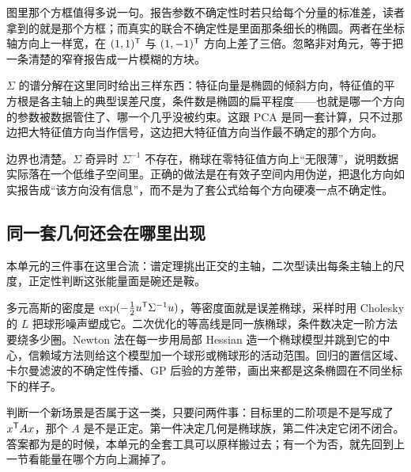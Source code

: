 图里那个方框值得多说一句。报告参数不确定性时若只给每个分量的标准差，读者拿到的就是那个方框；而真实的联合不确定性是里面那条细长的椭圆。两者在坐标轴方向上一样宽，在 \((1,1)^{\mathsf{T}}\) 与 \((1,-1)^{\mathsf{T}}\) 方向上差了三倍。忽略非对角元，等于把一条清楚的窄脊报告成一片模糊的方块。

\(\Sigma\) 的谱分解在这里同时给出三样东西：特征向量是椭圆的倾斜方向，特征值的平方根是各主轴上的典型误差尺度，条件数是椭圆的扁平程度——也就是哪一个方向的参数被数据管住了、哪一个几乎没被约束。这跟 PCA 是同一套计算，只不过那边把大特征值方向当作信号，这边把大特征值方向当作最不确定的那个方向。

边界也清楚。\(\Sigma\) 奇异时 \(\Sigma^{-1}\) 不存在，椭球在零特征值方向上``无限薄''，说明数据实际落在一个低维子空间里。正确的做法是在有效子空间内用伪逆，把退化方向如实报告成``该方向没有信息''，而不是为了套公式给每个方向硬凑一点不确定性。

\subsection{同一套几何还会在哪里出现}

本单元的三件事在这里合流：谱定理挑出正交的主轴，二次型读出每条主轴上的尺度，正定性判断这张能量面是碗还是鞍。

多元高斯的密度是 \(\exp(-\frac12u^{\mathsf{T}}\Sigma^{-1}u)\)，等密度面就是误差椭球，采样时用 Cholesky 的 \(L\) 把球形噪声塑成它。二次优化的等高线是同一族椭球，条件数决定一阶方法要绕多少圈。Newton 法在每一步用局部 Hessian 造一个椭球模型并跳到它的中心，信赖域方法则给这个模型加一个球形或椭球形的活动范围。回归的置信区域、卡尔曼滤波的不确定性传播、GP 后验的方差带，画出来都是这条椭圆在不同坐标下的样子。

判断一个新场景是否属于这一类，只要问两件事：目标里的二阶项是不是写成了 \(x^{\mathsf{T}}Ax\)，那个 \(A\) 是不是正定。第一件决定几何是椭球族，第二件决定它闭不闭合。答案都为是的时候，本单元的全套工具可以原样搬过去；有一个为否，就先回到上一节看能量在哪个方向上漏掉了。
